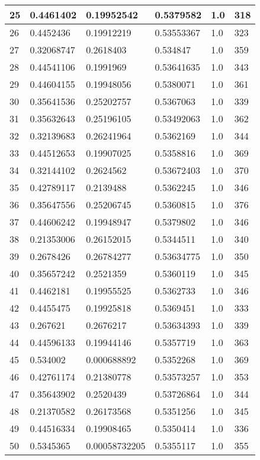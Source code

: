 \begin{longtable}{|l|l|l|l|l|l|}
25 & 0.4461402 & 0.19952542 & 0.5379582 & 1.0 & 318 \\ \hline 
26 & 0.4452436 & 0.19912219 & 0.53553367 & 1.0 & 323 \\ \hline 
27 & 0.32068747 & 0.2618403 & 0.534847 & 1.0 & 359 \\ \hline 
28 & 0.44541106 & 0.1991969 & 0.53641635 & 1.0 & 343 \\ \hline 
29 & 0.44604155 & 0.19948056 & 0.5380071 & 1.0 & 361 \\ \hline 
30 & 0.35641536 & 0.25202757 & 0.5367063 & 1.0 & 339 \\ \hline 
31 & 0.35632643 & 0.25196105 & 0.53492063 & 1.0 & 362 \\ \hline 
32 & 0.32139683 & 0.26241964 & 0.5362169 & 1.0 & 344 \\ \hline 
33 & 0.44512653 & 0.19907025 & 0.5358816 & 1.0 & 369 \\ \hline 
34 & 0.32144102 & 0.2624562 & 0.53672403 & 1.0 & 370 \\ \hline 
35 & 0.42789117 & 0.2139488 & 0.5362245 & 1.0 & 346 \\ \hline 
36 & 0.35647556 & 0.25206745 & 0.5360815 & 1.0 & 376 \\ \hline 
37 & 0.44606242 & 0.19948947 & 0.5379802 & 1.0 & 346 \\ \hline 
38 & 0.21353006 & 0.26152015 & 0.5344511 & 1.0 & 340 \\ \hline 
39 & 0.2678426 & 0.26784277 & 0.53634775 & 1.0 & 350 \\ \hline 
40 & 0.35657242 & 0.2521359 & 0.5360119 & 1.0 & 345 \\ \hline 
41 & 0.4462181 & 0.19955525 & 0.5362733 & 1.0 & 346 \\ \hline 
42 & 0.4455475 & 0.19925818 & 0.5369451 & 1.0 & 333 \\ \hline 
43 & 0.267621 & 0.2676217 & 0.53634393 & 1.0 & 339 \\ \hline 
44 & 0.44596133 & 0.19944146 & 0.5357719 & 1.0 & 363 \\ \hline 
45 & 0.534002 & 0.000688892 & 0.5352268 & 1.0 & 369 \\ \hline 
46 & 0.42761174 & 0.21380778 & 0.53573257 & 1.0 & 353 \\ \hline 
47 & 0.35643902 & 0.2520439 & 0.53726864 & 1.0 & 344 \\ \hline 
48 & 0.21370582 & 0.26173568 & 0.5351256 & 1.0 & 345 \\ \hline 
49 & 0.44516334 & 0.19908465 & 0.5350414 & 1.0 & 336 \\ \hline 
50 & 0.5345365 & 0.00058732205 & 0.5355117 & 1.0 & 355 \\ \hline 
\end{longtable}